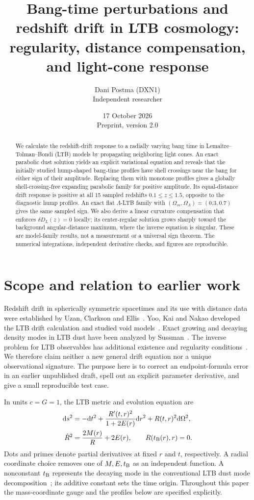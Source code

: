 \documentclass[11pt]{article}
\title{Bang-time perturbations and redshift drift in LTB cosmology:\\ regularity, distance compensation, and light-cone response}
\author{Dani Postma (DXN1)\\\small Independent researcher}
\date{17 October 2026\\\small Preprint, version 2.0}
\newcommand{\dd}{\mathrm d}
\newcommand{\tb}{t_{\rm B}}
\begin{document}
\maketitle
\begin{abstract}
We calculate the redshift-drift response to a radially varying bang time in Lema\^itre--Tolman--Bondi (LTB) models by propagating neighboring light cones. An exact parabolic dust solution yields an explicit variational equation and reveals that the initially studied hump-shaped bang-time profiles have shell crossings near the bang for either sign of their amplitude. Replacing them with monotone profiles gives a globally shell-crossing-free expanding parabolic family for positive amplitude. Its equal-distance drift response is positive at all 15 sampled redshifts $0.1\leq z\leq1.5$, opposite to the diagnostic hump profiles. An exact flat $\Lambda$-LTB family with $(\Omega_m,\Omega_\Lambda)=(0.3,0.7)$ gives the same sampled sign. We also derive a linear curvature compensation that enforces $\delta D_L(z)=0$ locally; its center-regular solution grows sharply toward the background angular-distance maximum, where the inverse equation is singular. These are model-family results, not a measurement or a universal sign theorem. The numerical integrations, independent derivative checks, and figures are reproducible.
\end{abstract}

\section{Scope and relation to earlier work}
Redshift drift in spherically symmetric spacetimes and its use with distance data were established by Uzan, Clarkson and Ellis~\cite{uzan}. Yoo, Kai and Nakao developed the LTB drift calculation and studied void models~\cite{yoo}. Exact growing and decaying density modes in LTB dust have been analyzed by Sussman~\cite{sussman}. The inverse problem for LTB observables has additional existence and regularity conditions~\cite{inverse}. We therefore claim neither a new general drift equation nor a unique observational signature. The purpose here is to correct an endpoint-formula error in an earlier unpublished draft, spell out an explicit parameter derivative, and give a small reproducible test case.

In units $c=G=1$, the LTB metric and evolution equation are
\begin{align}
\dd s^2&=-\dd t^2+\frac{R'(t,r)^2}{1+2E(r)}\dd r^2+R(t,r)^2\dd\Omega^2,\label{eq:metric}\\
\dot R^2&=\frac{2M(r)}{R}+2E(r),\qquad R(\tb(r),r)=0.\label{eq:field}
\end{align}
Dots and primes denote partial derivatives at fixed $r$ and $t$, respectively. A radial coordinate choice removes one of $M,E,\tb$ as an independent function. A nonconstant $\tb$ represents the decaying mode in the conventional LTB dust mode decomposition~\cite{sussman}; its additive constant sets the time origin. Throughout this paper the mass-coordinate gauge and the profiles below are specified explicitly.
\end{document}
